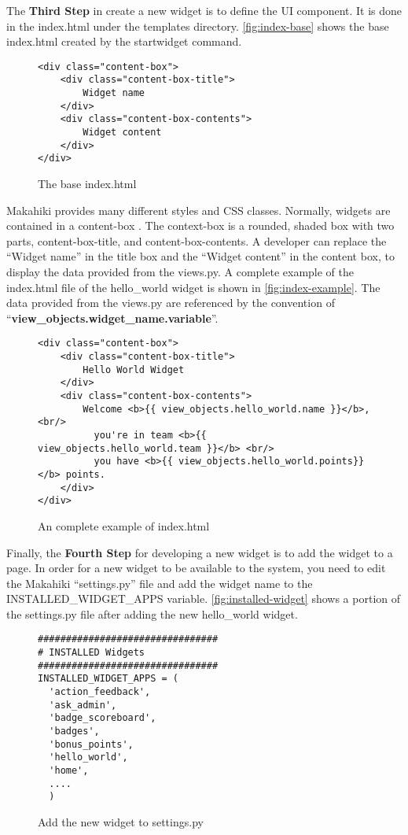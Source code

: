 The {\bf Third Step} in create a new widget is to define the UI component. It is done in the index.html under the templates directory.
\autoref{fig:index-base} shows the base index.html created by the startwidget command.

\begin{figure}[!ht]
\begin{lstlisting}
<div class="content-box">
    <div class="content-box-title">
        Widget name
    </div>
    <div class="content-box-contents">
        Widget content
    </div>
</div>
\end{lstlisting}
\caption{The base index.html}
\label{fig:index-base}
\end{figure}

Makahiki provides many different styles and CSS classes. Normally, widgets are contained in a content-box . The context-box is a rounded, shaded box with two parts, content-box-title, and content-box-contents. A developer can replace the ``Widget name'' in the title box and the ``Widget content'' in the content box, to display the data provided from the views.py. A complete example of the index.html file of the hello\_world widget is shown in \autoref{fig:index-example}. The data provided from the views.py are referenced by the convention of ``{\bf view\_objects.widget\_name.variable}''.

\begin{figure}[!ht]
\begin{lstlisting}
<div class="content-box">
    <div class="content-box-title">
        Hello World Widget
    </div>
    <div class="content-box-contents">
        Welcome <b>{{ view_objects.hello_world.name }}</b>, <br/>
          you're in team <b>{{ view_objects.hello_world.team }}</b> <br/>
          you have <b>{{ view_objects.hello_world.points}}</b> points.
    </div>
</div>
\end{lstlisting}
\caption{An complete example of index.html}
\label{fig:index-example}
\end{figure}

Finally, the {\bf Fourth Step} for developing a new widget is to add the widget to a page. In order for a new widget to be available to the system, you need to edit the Makahiki ``settings.py'' file and add the widget name to the INSTALLED\_WIDGET\_APPS variable. \autoref{fig:installed-widget} shows a portion of the settings.py file after adding the new hello\_world widget. 
\begin{figure}[!ht]
\begin{lstlisting}
################################
# INSTALLED Widgets
################################
INSTALLED_WIDGET_APPS = (
  'action_feedback',
  'ask_admin',
  'badge_scoreboard',
  'badges',
  'bonus_points',
  'hello_world',
  'home',
  ....
  )
\end{lstlisting}
\caption{Add the new widget to settings.py}
\label{fig:installed-widget}
\end{figure}

